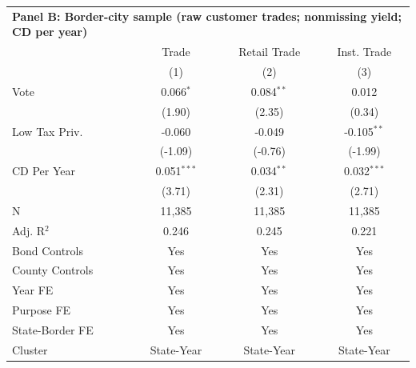 \begingroup
\centering
\begin{tabular*}{\textwidth}{@{\extracolsep{\fill}}lccc}
\multicolumn{5}{l}{\textbf{Panel B: Border-city sample (raw customer trades; nonmissing yield; CD per year)}}\\

\addlinespace
   \toprule
                   & Trade         & Retail Trade & Inst. Trade\\  
                   & (1)           & (2)          & (3)\\  
   \midrule 
   Vote            & 0.066$^{*}$   & 0.084$^{**}$ & 0.012\\   
                   & (1.90)       & (2.35)      & (0.34)\\   
   Low Tax Priv.   & -0.060        & -0.049       & -0.105$^{**}$\\   
                   & (-1.09)      & (-0.76)     & (-1.99)\\   
   CD Per Year     & 0.051$^{***}$ & 0.034$^{**}$ & 0.032$^{***}$\\   
                   & (3.71)       & (2.31)      & (2.71)\\   
   \hline
   N    & 11,385        & 11,385       & 11,385\\  
   Adj. R$^2$  & 0.246         & 0.245        & 0.221\\  
   Bond Controls   & Yes           & Yes          & Yes\\  
   County Controls & Yes           & Yes          & Yes\\  
   Year FE         & Yes           & Yes          & Yes\\  
   Purpose FE      & Yes           & Yes          & Yes\\  
   State-Border FE & Yes           & Yes          & Yes\\  
   Cluster              & State-Year & State-Year & State-Year\\  
   \bottomrule
\end{tabular*}
\par\endgroup
